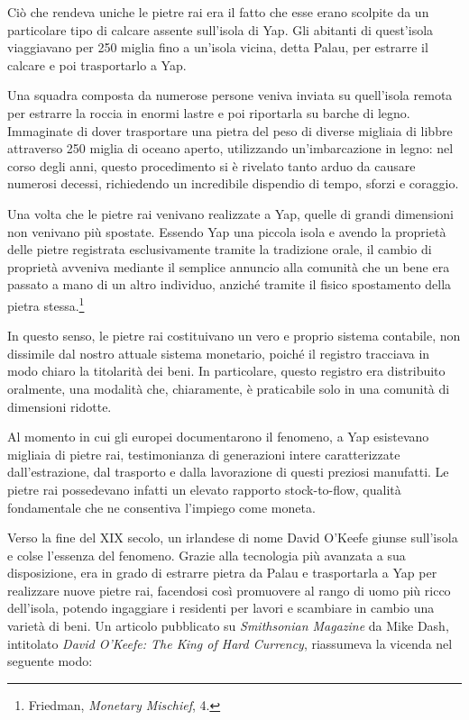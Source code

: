 \documentclass[
  a5paper,
  smalldemyvopaper,10pt,twoside,onecolumn,openright,extrafontsizes,hidelinks]{memoir}
\begin{document}
Ciò che rendeva uniche le pietre rai era il fatto che esse erano
scolpite da un particolare tipo di calcare assente sull'isola di Yap.
Gli abitanti di quest'isola viaggiavano per 250 miglia fino a un'isola
vicina, detta Palau, per estrarre il calcare e poi trasportarlo a Yap.

Una squadra composta da numerose persone veniva inviata su quell'isola
remota per estrarre la roccia in enormi lastre e poi riportarla su
barche di legno. Immaginate di dover trasportare una pietra del peso di
diverse migliaia di libbre attraverso 250 miglia di oceano aperto,
utilizzando un'imbarcazione in legno: nel corso degli anni, questo
procedimento si è rivelato tanto arduo da causare numerosi decessi,
richiedendo un incredibile dispendio di tempo, sforzi e coraggio.

Una volta che le pietre rai venivano realizzate a Yap, quelle di grandi
dimensioni non venivano più spostate. Essendo Yap una piccola isola e
avendo la proprietà delle pietre registrata esclusivamente tramite la
tradizione orale, il cambio di proprietà avveniva mediante il semplice
annuncio alla comunità che un bene era passato a mano di un altro
individuo, anziché tramite il fisico spostamento della pietra
stessa.\footnote{Friedman, \emph{Monetary Mischief}, 4.}

In questo senso, le pietre rai costituivano un vero e proprio sistema
contabile, non dissimile dal nostro attuale sistema monetario, poiché il
registro tracciava in modo chiaro la titolarità dei beni. In
particolare, questo registro era distribuito oralmente, una modalità
che, chiaramente, è praticabile solo in una comunità di dimensioni
ridotte.

Al momento in cui gli europei documentarono il fenomeno, a Yap
esistevano migliaia di pietre rai, testimonianza di generazioni intere
caratterizzate dall'estrazione, dal trasporto e dalla lavorazione di
questi preziosi manufatti. Le pietre rai possedevano infatti un elevato
rapporto stock-to-flow, qualità fondamentale che ne consentiva l'impiego
come moneta.

Verso la fine del XIX secolo, un irlandese di nome David O'Keefe giunse
sull'isola e colse l'essenza del fenomeno. Grazie alla tecnologia più
avanzata a sua disposizione, era in grado di estrarre pietra da Palau e
trasportarla a Yap per realizzare nuove pietre rai, facendosi così
promuovere al rango di uomo più ricco dell'isola, potendo ingaggiare i
residenti per lavori e scambiare in cambio una varietà di beni. Un
articolo pubblicato su \emph{Smithsonian Magazine} da Mike Dash,
intitolato \emph{David O'Keefe: The King of Hard Currency}, riassumeva
la vicenda nel seguente modo:
\end{document}
